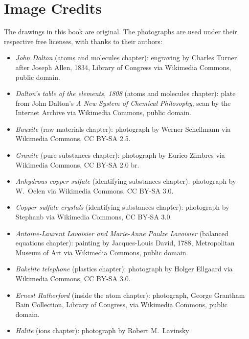 \chapter*{Image Credits}

The drawings in this book are original. The photographs are used
under their respective free licenses, with thanks to their authors:

\begin{itemize}
  \item \emph{John Dalton} (atoms and molecules chapter): engraving by
        Charles Turner after Joseph Allen, 1834, Library of Congress via
        Wikimedia Commons, public domain.
  \item \emph{Dalton's table of the elements, 1808} (atoms and molecules
        chapter): plate from John Dalton's \emph{A New System of Chemical
        Philosophy}, scan by the Internet Archive via Wikimedia Commons,
        public domain.
  \item \emph{Bauxite} (raw materials chapter): photograph by Werner
        Schellmann via Wikimedia Commons, CC BY-SA 2.5.
  \item \emph{Granite} (pure substances chapter): photograph by Eurico
        Zimbres via Wikimedia Commons, CC BY-SA 2.0 br.
  \item \emph{Anhydrous copper sulfate} (identifying substances chapter):
        photograph by W.~Oelen via Wikimedia Commons, CC BY-SA 3.0.
  \item \emph{Copper sulfate crystals} (identifying substances chapter):
        photograph by Stephanb via Wikimedia Commons, CC BY-SA 3.0.
  \item \emph{Antoine-Laurent Lavoisier and Marie-Anne Paulze Lavoisier}
        (balanced equations chapter): painting by Jacques-Louis David,
        1788, Metropolitan Museum of Art via Wikimedia Commons, public
        domain.
  \item \emph{Bakelite telephone} (plastics chapter): photograph by Holger
        Ellgaard via Wikimedia Commons, CC BY-SA 3.0.
  \item \emph{Ernest Rutherford} (inside the atom chapter): photograph,
        George Grantham Bain Collection, Library of Congress, via
        Wikimedia Commons, public domain.
  \item \emph{Halite} (ions chapter): photograph by Robert M.~Lavinsky

\end{itemize}
